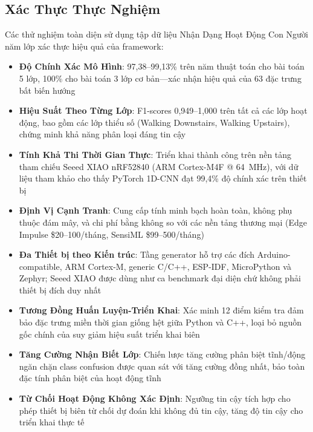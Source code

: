 \subsection{Xác Thực Thực Nghiệm}
Các thử nghiệm toàn diện sử dụng tập dữ liệu Nhận Dạng Hoạt Động Con Người năm lớp xác thực hiệu quả của framework:
\begin{itemize}
    \item \textbf{Độ Chính Xác Mô Hình}: 97,38--99,13\% trên năm thuật toán cho bài toán 5 lớp, 100\% cho bài toán 3 lớp cơ bản---xác nhận hiệu quả của 63 đặc trưng bất biến hướng
    \item \textbf{Hiệu Suất Theo Từng Lớp}: F1-scores 0,949--1,000 trên tất cả các lớp hoạt động, bao gồm các lớp thiểu số (Walking Downstairs, Walking Upstairs), chứng minh khả năng phân loại đáng tin cậy
    \item \textbf{Tính Khả Thi Thời Gian Thực}: Triển khai thành công trên nền tảng tham chiếu Seeed XIAO nRF52840 (ARM Cortex-M4F @ 64~MHz), với dữ liệu tham khảo cho thấy PyTorch 1D-CNN đạt 99,4\% độ chính xác trên thiết bị
    \item \textbf{Định Vị Cạnh Tranh}: Cung cấp tính minh bạch hoàn toàn, không phụ thuộc đám mây, và chi phí bằng không so với các nền tảng thương mại (Edge Impulse \$20--100/tháng, SensiML \$99--500/tháng)
    \item \textbf{Đa Thiết bị theo Kiến trúc}: Tầng generator hỗ trợ các đích Arduino-compatible, ARM Cortex-M, generic C/C++, ESP-IDF, MicroPython và Zephyr; Seeed XIAO được dùng như ca benchmark đại diện chứ không phải thiết bị đích duy nhất
    \item \textbf{Tương Đồng Huấn Luyện-Triển Khai}: Xác minh 12 điểm kiểm tra đảm bảo đặc trưng miền thời gian giống hệt giữa Python và C++, loại bỏ nguồn gốc chính của suy giảm hiệu suất triển khai biên
    \item \textbf{Tăng Cường Nhận Biết Lớp}: Chiến lược tăng cường phân biệt tĩnh/động ngăn chặn class confusion được quan sát với tăng cường đồng nhất, bảo toàn đặc tính phân biệt của hoạt động tĩnh
    \item \textbf{Từ Chối Hoạt Động Không Xác Định}: Ngưỡng tin cậy tích hợp cho phép thiết bị biên từ chối dự đoán khi không đủ tin cậy, tăng độ tin cậy cho triển khai thực tế
\end{itemize}

